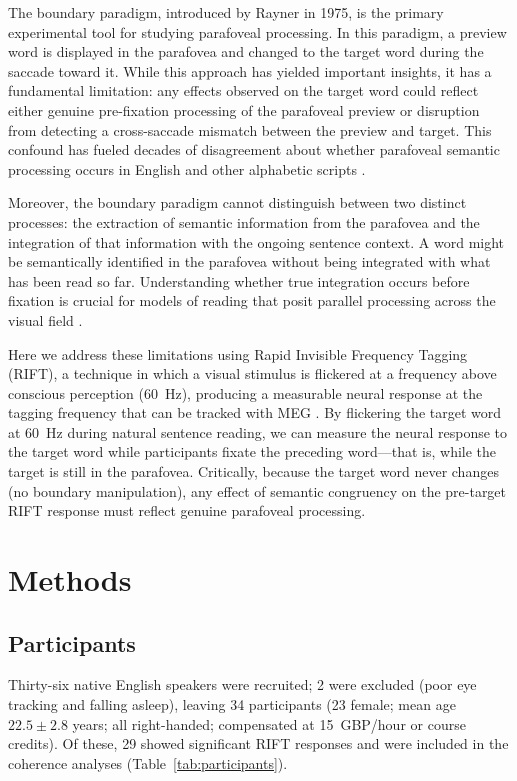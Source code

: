 \documentclass[12pt]{article}
\begin{document}
The boundary paradigm, introduced by Rayner in 1975, is the primary experimental tool for studying parafoveal processing. In this paradigm, a preview word is displayed in the parafovea and changed to the target word during the saccade toward it. While this approach has yielded important insights, it has a fundamental limitation: any effects observed on the target word could reflect either genuine pre-fixation processing of the parafoveal preview or disruption from detecting a cross-saccade mismatch between the preview and target. This confound has fueled decades of disagreement about whether parafoveal semantic processing occurs in English and other alphabetic scripts \citep{henderson2006eye, snell2017integration}.

Moreover, the boundary paradigm cannot distinguish between two distinct processes: the extraction of semantic information from the parafovea and the integration of that information with the ongoing sentence context. A word might be semantically identified in the parafovea without being integrated with what has been read so far. Understanding whether true integration occurs before fixation is crucial for models of reading that posit parallel processing across the visual field \citep{hyona2004role}.

Here we address these limitations using Rapid Invisible Frequency Tagging (RIFT), a technique in which a visual stimulus is flickered at a frequency above conscious perception (60~Hz), producing a measurable neural response at the tagging frequency that can be tracked with MEG \citep{zhigalov2020probing, pan2021rapid}. By flickering the target word at 60~Hz during natural sentence reading, we can measure the neural response to the target word while participants fixate the preceding word---that is, while the target is still in the parafovea. Critically, because the target word never changes (no boundary manipulation), any effect of semantic congruency on the pre-target RIFT response must reflect genuine parafoveal processing.

\section{Methods}

\subsection{Participants}

Thirty-six native English speakers were recruited; 2 were excluded (poor eye tracking and falling asleep), leaving 34 participants (23 female; mean age $22.5 \pm 2.8$ years; all right-handed; compensated at 15~GBP/hour or course credits). Of these, 29 showed significant RIFT responses and were included in the coherence analyses (Table~\ref{tab:participants}).
\end{document}
